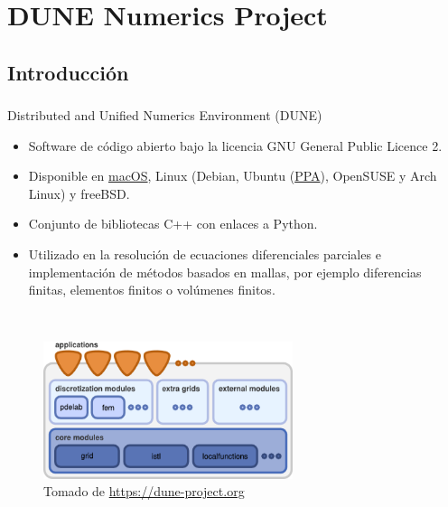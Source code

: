 \section{DUNE Numerics Project}
\subsection{Introducción}

\begin{frame}
	\frametitle{\secname}
	\framesubtitle{\subsecname}

	\begin{alertblock}{Distributed and Unified Numerics Environment (DUNE)}
		\begin{itemize}
			\item Software de código abierto bajo la licencia GNU General Public Licence 2.
			\item Disponible en \href{https://github.com/dune-copasi/homebrew-tap}{macOS}, Linux (Debian, Ubuntu  (\href{https://launchpad.net/~opm/+archive/ubuntu/ppa}{PPA}), OpenSUSE y Arch Linux) y freeBSD.
			\item Conjunto de bibliotecas C++ con enlaces a Python.
			\item Utilizado en la resolución de ecuaciones diferenciales parciales e implementación de métodos basados en mallas, por ejemplo diferencias finitas, elementos finitos o volúmenes finitos.
		\end{itemize}
	\end{alertblock}

	\

	\begin{figure}[ht!]
		\centering
		\includegraphics[height=4cm]{dunedesign}
		\caption{Tomado de \url{https://dune-project.org}}
	\end{figure}

\end{frame}

